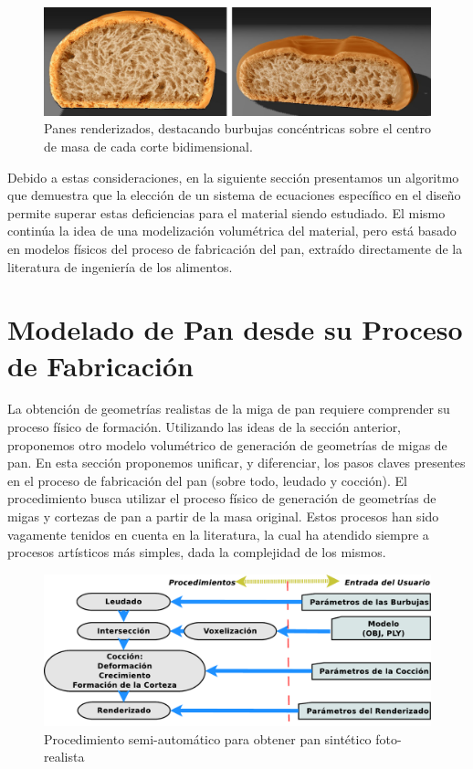 \begin{figure}
  \centerline{\includegraphics[width=12cm]{figures/Fig11CAVW}}
  \caption[Panes renderizados con burbujas concéntricas]{Panes renderizados, destacando burbujas concéntricas sobre el centro de masa de cada corte bidimensional.}
  \label{fg:Fig11}
\end{figure}


Debido a estas consideraciones, en la siguiente sección presentamos un algoritmo que demuestra que la elección de un sistema de ecuaciones específico en el diseño permite superar estas deficiencias para el material siendo estudiado.
El mismo continúa la idea de una modelización volumétrica del material, pero está basado en modelos físicos del proceso de fabricación del pan, extraído directamente de la literatura de ingeniería de los alimentos.

\section{Modelado de Pan desde su Proceso de Fabricación}
La obtención de geometrías realistas de la miga de pan requiere comprender su proceso físico de formación.
Utilizando las ideas de la sección anterior, proponemos otro modelo volumétrico de generación de geometrías de migas de pan.
En esta sección proponemos unificar, y diferenciar, los pasos claves presentes en el proceso de fabricación del pan (sobre todo, leudado y cocción).
El procedimiento busca utilizar el proceso físico de generación de geometrías de migas y cortezas de pan a partir de la masa original.
Estos procesos han sido vagamente tenidos en cuenta en la literatura, la cual ha atendido siempre a procesos artísticos más simples, dada la complejidad de los mismos.


\begin{figure}
\includegraphics[width=12cm]{figures/pipeline}
\caption{Procedimiento semi-automático para obtener pan sintético foto-realista}
\label{FigPipeline}
\end{figure}


